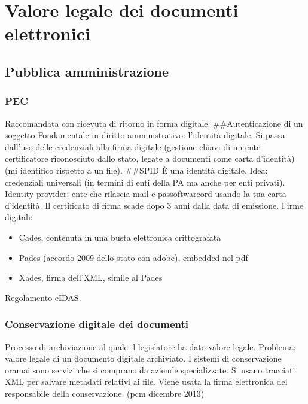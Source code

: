 

\chapter{Valore legale dei documenti elettronici}

\section{Pubblica amministrazione}

\subsection{PEC}

Raccomandata con ricevuta di ritorno in forma digitale.
\#\#Autenticazione di un soggetto Fondamentale in diritto
amministrativo: l'identità digitale. Si passa dall'uso delle credenziali
alla firma digitale (gestione chiavi di un ente certificatore
riconosciuto dallo stato, legate a documenti come carta d'identità) (mi
identifico rispetto a un file). \#\#SPID È una identità digitale. Idea:
credenziali universali (in termini di enti della PA ma anche per enti
privati). Identity provider: ente che rilascia mail e passoftwareord usando la
tua carta d'identità. Il certificato di firma scade dopo 3 anni dalla
data di emissione. Firme digitali:

\begin{itemize}
\item
  Cades, contenuta in una busta elettronica crittografata
\item
  Pades (accordo 2009 dello stato con adobe), embedded nel pdf
\item
  Xades, firma dell'XML, simile al Pades
\end{itemize}

Regolamento eIDAS.

\subsection{Conservazione digitale dei
documenti}

Processo di archiviazione al quale il legislatore ha dato valore legale.
Problema: valore legale di un documento digitale archiviato. I sistemi
di conservazione oramai sono servizi che si comprano da aziende
specializzate. Si usano tracciati XML per salvare metadati relativi ai
file. Viene usata la firma elettronica del responsabile della
conservazione. (pcm dicembre 2013)

